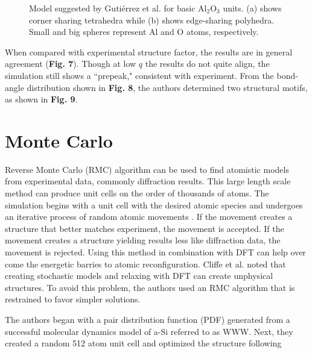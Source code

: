\documentclass[3p,review,12pt]{elsarticle}
\begin{document}
\begin{figure}[H]
\begin{minipage}[b]{0.45\textwidth}
		\centering
		\caption{Model suggested by Guti\'errez et al. \cite{Gutierrez2002} for basic Al$_{2}$O$_{3}$ units. (a) shows corner sharing tetrahedra while (b) shows edge-sharing polyhedra. Small and big spheres represent Al and O atoms, respectively. }
	\end{minipage}
\end{figure}
\par 
When compared with experimental structure factor, the results are in general agreement (\textbf{Fig. 7}). Though at low $q$ the results do not quite align, the simulation still shows a ``prepeak," consistent with experiment. From the bond-angle distribution shown in \textbf{Fig. 8}, the authors determined two structural motifs, as shown in \textbf{Fig. 9}.


\section{Monte Carlo}
Reverse Monte Carlo (RMC) algorithm can be used to find atomistic models from experimental data, commonly diffraction results. This large length scale method can produce unit cells on the order of thousands of atoms. The simulation begins with a unit cell with the desired atomic species and undergoes an iterative process of random atomic movements \cite{Cliffe2017}. If the movement creates a structure that better matches experiment, the movement is accepted. If the movement creates a structure yielding results less like diffraction data, the movement is rejected. Using this method in combination with DFT can help over come the energetic barries to atomic reconfiguration. Cliffe et al. \cite{Cliffe2017} noted that creating stochastic models and relaxing with DFT can create unphysical structures. To avoid this problem, the authors used an RMC algorithm that is restrained to favor simpler solutions.
\par 
The authors began with a pair distribution function (PDF) generated from a  successful molecular dynamics model of a-Si referred to as WWW. Next, they created a random 512 atom unit cell and optimized the structure following
\end{document}
